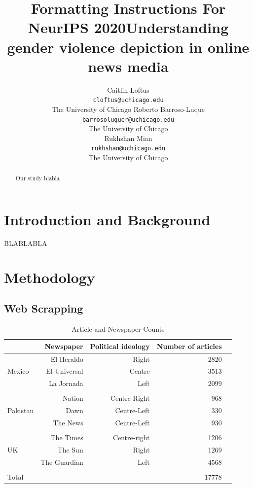 \documentclass{article}
\title{Formatting Instructions For NeurIPS 2020}
\title{Understanding gender violence depiction in online news media}
\author{Caitlin Loftus \\
	\texttt{cloftus@uchicago.edu}  \\
	The University of Chicago
	\AND
	Roberto Barroso-Luque\\
	\texttt{barrosoluquer@uchicago.edu} \\
    The University of Chicago\\
	\AND
	Rukhshan Mian\\
	\texttt{rukhshan@uchicago.edu} \\
	The University of Chicago\\}
\begin{document}
\maketitle

\begin{abstract}{
		Our study blabla
	}
\end{abstract}

\newpage
\section{Introduction and Background}{
BLABLABLA

}
\newpage

\section{Methodology}{
	
\subsection{Web Scrapping}{
\begin{table}[!htp]\centering
	\caption{Article and Newspaper Counts}\label{tab: }
	\scriptsize
	\begin{tabular}{lrrrr}\toprule
		&\textbf{Newspaper} &\textbf{Political ideology} &\textbf{Number of articles} \\\midrule
		\multirow{3}{*}{Mexico} &El Heraldo &Right &2820 \\
		&El Universal &Centre &3513 \\
		&La Jornada &Left &2099 \\
		& & & \\
		\multirow{3}{*}{Pakistan} &Nation &Centre-Right &968 \\
		&Dawn &Centre-Left &330 \\
		&The News &Centre-Left &930 \\
		& & & \\
		\multirow{3}{*}{UK} &The Times &Centre-right &1206 \\
		&The Sun &Right &1269 \\
		&The Guardian &Left &4568 \\
		& & & \\
		Total & & &17778 \\
		\bottomrule
	\end{tabular}
\end{table}

}



	
	
}
\end{document}

